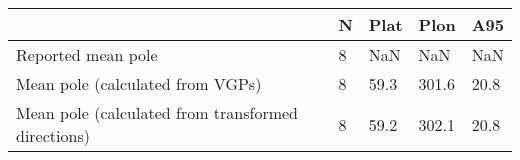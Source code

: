 \begin{tabular}{lllll}
\toprule
{} &  N &  Plat &   Plon &   A95 \\
\midrule
Reported mean pole                                 &  8 &   NaN &    NaN &   NaN \\
Mean pole (calculated from VGPs)                   &  8 &  59.3 &  301.6 &  20.8 \\
Mean pole (calculated from transformed directions) &  8 &  59.2 &  302.1 &  20.8 \\
\bottomrule
\end{tabular}
